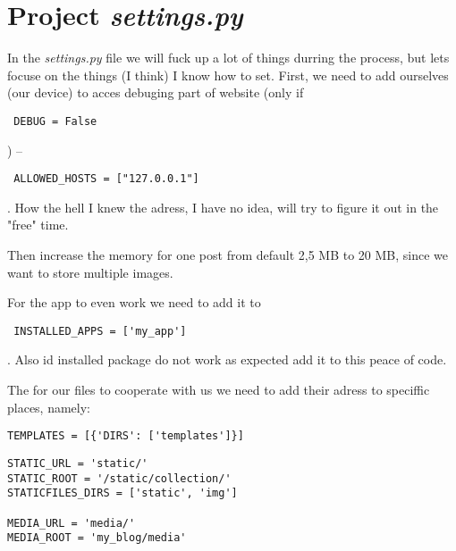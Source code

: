 \documentclass[12pt,a4paper]{article}
\begin{document}
\section{Project \textit{settings.py}}
In the \textit{settings.py} file we will fuck up a lot of things durring the process, but lets focuse on the things (I think) I know how to set.
First, we need to add ourselves (our device) to acces debuging part of website (only if \begin{verbatim} DEBUG = False\end{verbatim}) -- \begin{verbatim} ALLOWED_HOSTS = ["127.0.0.1"] \end{verbatim}.
How the hell I knew the adress, I have no idea, will try to figure it out in the "free" time.
\par
Then increase the memory for one post from default 2,5 MB to 20 MB, since we want to store multiple images.
\par
For the app to even work we need to add it to \begin{verbatim} INSTALLED_APPS = ['my_app']\end{verbatim}. Also id installed package do not work as expected add it to this peace of code.
\par
The for our files to cooperate with us we need to add their adress to speciffic places, namely:\\
\begin{verbatim}
TEMPLATES = [{'DIRS': ['templates']}]
\end{verbatim}

\begin{verbatim}STATIC_URL = 'static/'
STATIC_ROOT = '/static/collection/'
STATICFILES_DIRS = ['static', 'img']

MEDIA_URL = 'media/'
MEDIA_ROOT = 'my_blog/media' \end{verbatim}
\end{document}

